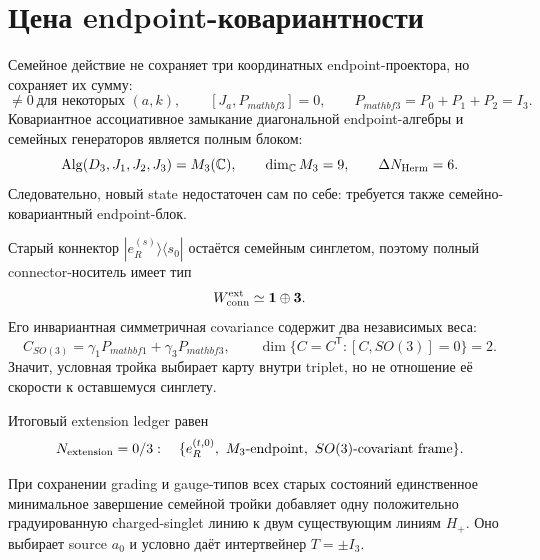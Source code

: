 \section{Цена endpoint-ковариантности}

Семейное действие не сохраняет три координатных endpoint-проектора, но
сохраняет их сумму:
\begin{equation}
 [J_a,P_k]\ne0\ \text{для некоторых }(a,k),
 \qquad [J_a,P_{mathbf3}]=0,
 \qquad P_{mathbf3}=P_0+P_1+P_2=I_3.
 \label{eq:v8-baryon-c0-family-triplet-endpoint-projectors}
\end{equation}
Ковариантное ассоциативное замыкание диагональной endpoint-алгебры и
семейных генераторов является полным блоком:
\begin{equation}
 \operatorname{Alg}(D_3,J_1,J_2,J_3)=M_3(\mathbb C),
 \qquad \dim_{\mathbb C}M_3=9,
 \qquad \Delta N_{\rm Herm}=6.
 \label{eq:v8-baryon-c0-family-triplet-endpoint-m3-closure}
\end{equation}
Следовательно, новый state недостаточен сам по себе: требуется также
семейно-ковариантный endpoint-блок.

Старый коннектор $|e_R^{(s)}\rangle\langle s_0|$ остаётся семейным
синглетом, поэтому полный connector-носитель имеет тип
\begin{equation}
 W_{\rm conn}^{\rm ext}\simeq\mathbf1\oplus\mathbf3.
 \label{eq:v8-baryon-c0-extended-connector-one-plus-three}
\end{equation}
Его инвариантная симметричная covariance содержит два независимых веса:
\begin{equation}
 C_{SO(3)}=\gamma_1P_{mathbf1}+\gamma_3P_{mathbf3},
 \qquad \dim\{C=C^{\mathsf T}:[C,SO(3)]=0\}=2.
 \label{eq:v8-baryon-c0-singlet-triplet-covariance-two-weights}
\end{equation}
Значит, условная тройка выбирает карту внутри triplet, но не отношение её
скорости к оставшемуся синглету.

Итоговый extension ledger равен
\begin{equation}
 N_{\rm extension}=0/3:
 \quad\{e_R^{(t,0)},\ M_3\text{-endpoint},\ SO(3)\text{-covariant frame}\}.
 \label{eq:v8-baryon-c0-family-triplet-extension-ledger}
\end{equation}

\begin{theorem}
При сохранении grading и gauge-типов всех старых состояний единственное
минимальное завершение семейной тройки добавляет одну положительно
градуированную charged-singlet линию к двум существующим линиям $H_+$.
Оно выбирает source $a_0$ и условно даёт интертвейнер $T=\pm I_3$.
\end{theorem}

